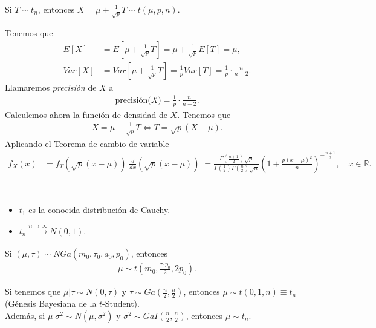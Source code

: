 \begin{defi}
    Si $T \sim t_n$, entonces $X = \mu + \frac{1}{\sqrt{p}}T \sim t(\mu,p,n)$.
\end{defi}
Tenemos que
\begin{align*}
    E[X] &= E\left[\mu + \frac{1}{\sqrt{p}}T \right] = \mu + \frac{1}{\sqrt{p}} E[T] = \mu, \\
    Var[X] &=  Var\left[\mu + \frac{1}{\sqrt{p}}T \right] = \frac{1}{p}Var[T] = \frac{1}{p} \cdot \frac{n}{n-2}.
\end{align*}
Llamaremos \textit{precisión} de $X$ a 
\begin{align*}
    \text{precisión($X$)} = \frac{1}{p} \cdot \frac{n}{n-2}.
\end{align*}
Calculemos ahora la función de densidad de $X$. Tenemos que
\begin{align*}
    X = \mu + \frac{1}{\sqrt{p}}T \Longleftrightarrow T = \sqrt{p}(X - \mu).
\end{align*}
Aplicando el Teorema de cambio de variable
\begin{align*}
    f_X(x) &= f_T\left( \sqrt{p} (x - \mu) \right) \left| \frac{d}{dx} \left( \sqrt{p}(x -\mu) \right) \right| 
    = \frac{\Gamma\left( \frac{n+1}{2} \right)\sqrt{p}}{\Gamma\left( \frac{1}{2} \right)\Gamma\left( \frac{n}{2} \right)\sqrt{n}} \left(1 + \frac{p(x-\mu)^2}{n} \right)^{-\frac{n+1}{2}}, \quad x \in \mathbb{R}.
\end{align*}

\begin{obs} \
    \begin{itemize}
        \item $t_1$ es la conocida distribución de Cauchy.
        \item $t_n \xrightarrow[]{n \to \infty} N(0,1)$.
    \end{itemize}
\end{obs}

\begin{teo}
    Si $(\mu, \tau) \sim NGa(m_0,\tau_0,a_0,p_0)$, entonces
    \begin{align*}
        \mu \sim t\left(m_0,  \frac{\tau_0p_0}{2},2p_0 \right).
    \end{align*}
\end{teo}

\begin{obs}
    Si tenemos que $\mu | \tau \sim N(0,\tau)$ y $\tau \sim Ga\left( \frac{n}{2},\frac{n}{2}\right)$, entonces $\mu \sim t(0,1,n) \equiv t_n$ (Génesis Bayesiana de la $t$-Student).
    \\
    \newline
    Además, si $\mu | \sigma^2 \sim N(\mu,\sigma^2)$ y $\sigma^2 \sim GaI\left( \frac{n}{2}, \frac{n}{2} \right)$, entonces $\mu \sim t_n$.
\end{obs}


